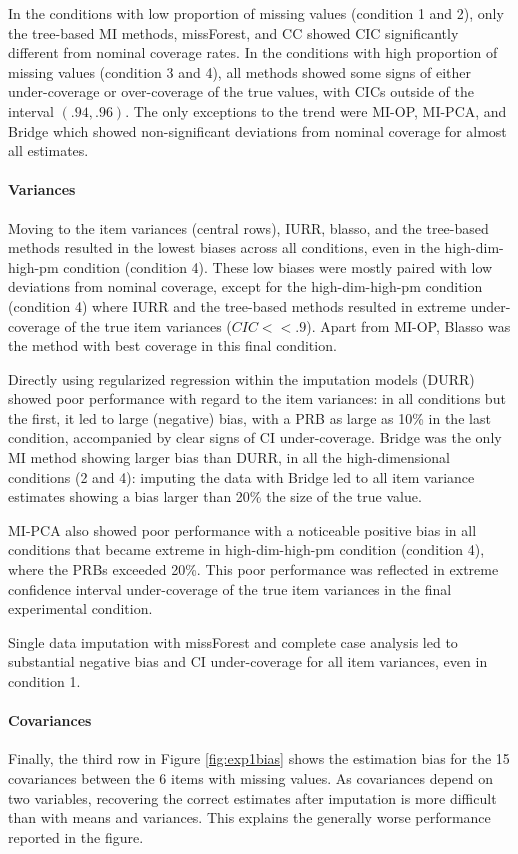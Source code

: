 \documentclass[11pt]{article}
\begin{document}
	In the conditions with low proportion of missing values (condition 1 and 2), only the tree-based MI methods,
	missForest, and CC showed CIC significantly different from nominal coverage rates.
	In the conditions with high proportion of missing values (condition 3 and 4), all methods showed some signs 
	of either under-coverage or over-coverage of the true values, with CICs outside of the interval $(.94, .96)$.
	The only exceptions to the trend were MI-OP, MI-PCA, and Bridge which showed non-significant deviations from 
	nominal coverage for almost all estimates.

	\paragraph{Variances} 
	Moving to the item variances (central rows), IURR, blasso, and the tree-based methods resulted in the lowest
	biases across all conditions, even in the high-dim-high-pm condition (condition 4).
	These low biases were mostly paired with low deviations from nominal coverage, except for the high-dim-high-pm
	condition (condition 4) where IURR and the tree-based methods resulted in extreme under-coverage of the true item 
	variances ($CIC << .9$).
	Apart from MI-OP, Blasso was the method with best coverage in this final condition.
	
	Directly using regularized regression within the imputation models (DURR) showed poor performance with regard 
	to the item variances: in all conditions but the first, it led to large (negative) bias, with a PRB as large as 10\% in 
	the last condition, accompanied by clear signs of CI under-coverage.
	Bridge was the only MI method showing larger bias than DURR, in all the high-dimensional conditions (2 and 4):
	imputing the data with Bridge led to all item variance estimates showing a bias larger than 20\% the size of the
	true value.

	MI-PCA also showed poor performance with a noticeable positive bias in all conditions that became extreme in
	high-dim-high-pm condition (condition 4), where the PRBs exceeded 20\%.
	This poor performance was reflected in extreme confidence interval under-coverage of the true item variances in
	the final experimental condition.

	Single data imputation with missForest and complete case analysis led to substantial negative bias and 
	CI under-coverage for all item variances, even in condition 1.

	\paragraph{Covariances}
	Finally, the third row in Figure \ref{fig:exp1bias} shows the estimation bias for the 15 covariances between 
	the 6 items with missing values.
	As covariances depend on two variables, recovering the correct estimates after imputation is 
	more difficult than with means and variances.
	This explains the generally worse performance reported in the figure.
\end{document}
